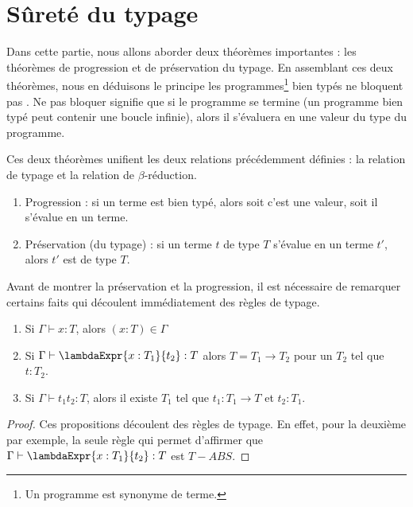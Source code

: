 \section{Sûreté du typage}

Dans cette partie, nous allons aborder deux théorèmes importantes : les
théorèmes de progression et de préservation du typage. En assemblant ces deux
théorèmes, nous en déduisons le principe \og les
programmes\footnote{Un programme est synonyme de terme.}
bien typés ne bloquent pas \fg. Ne pas bloquer signifie que si le programme se
termine (un programme bien typé peut contenir une boucle infinie), alors il
s'évaluera en une valeur du type du programme.

Ces deux théorèmes unifient les deux relations précédemment définies : la
relation de typage et la relation de $\beta$-réduction.

\begin{enumerate}
  \item Progression : si un terme est bien typé, alors soit c'est une
    valeur, soit il s'évalue en un terme.
    \item Préservation (du typage) : si un terme $t$ de type $T$ s'évalue en un terme $t'$,
      alors $t'$ est de type $T$.
\end{enumerate}

Avant de montrer la préservation et la progression, il est nécessaire de
remarquer certains faits qui découlent immédiatement des règles de typage.

\begin{lemma} 
  \label{lemma:simply-typed-lambda-calculus-inversion}
  \begin{enumerate}
    \item Si $\Gamma \vdash x : T$, alors $(x : T) \in \Gamma$
    \item Si $\Gamma \vdash \lambdaExpr{x : T_{1}}{t_{2}} : T$ alors $T = T_{1}
      \rightarrow T_{2}$ pour un $T_{2}$ tel que $t : T_{2}$.
    \item Si $\Gamma \vdash t_{1} t_{2} : T$, alors il existe $T_{1}$
      tel que $t_{1} : T_{1} \rightarrow T$ et $t_{2} : T_{1}$.
  \end{enumerate}
\end{lemma}
  
\begin{proof}
  \label{proof:simply-typed-lambda-calculus-inversion}
  Ces propositions découlent des règles de typage. En effet, pour la deuxième
  par exemple, la seule règle qui permet d'affirmer que $\Gamma \vdash
  \lambdaExpr{x : T_{1}}{t_{2}} : T$ est $T-ABS$.
\end{proof}

